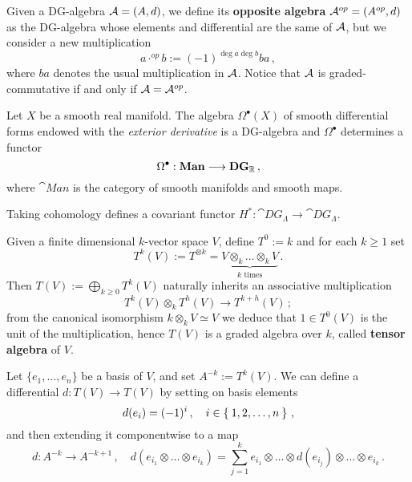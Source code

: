 	\begin{df}
		Given a DG-algebra $\mathcal{A} = (A,d)$, we define its \textbf{opposite algebra}
		$\mathcal{A}^{op} = (A^{op},d)$ as the DG-algebra whose elements and differential
		are the same of $\mathcal{A}$, but we consider a new multiplication
		\begin{equation*}
			a \cdot^{op} b := (-1)^{\deg{a}\deg{b}} ba\,,
		\end{equation*}
		where $ba$ denotes the usual multiplication in $\mathcal{A}$.
		Notice that $\mathcal{A}$ is graded-commutative if and only if $\mathcal{A} = \mathcal{A}^{op}$.
	\end{df}
	
	\begin{ex}
		Let $X$ be a smooth real manifold.
		The algebra $\Omega^{\bullet}(X)$
		of smooth differential forms endowed with 
		the \emph{exterior derivative} is a DG-algebra
		and $\Omega^{\bullet}$ determines a functor
		\begin{equation*}
			\Omega^{\bullet} : {\normalfont\textbf{Man}} \longrightarrow {\normalfont\textbf{DG}}_{{\mathbb R}}\,,
		\end{equation*}
		where $\cat{Man}$ is the category of smooth manifolds and smooth maps.
	\end{ex}
	
	\begin{ex}
		Taking cohomology defines a covariant functor 
		$H^{*}:\cat{DG}_{\Lambda} \to \cat{DG}_{\Lambda}$.
	\end{ex}
	
	\begin{ex}
		Given a finite dimensional $k$-vector space $V$, 
		define $T^{0} := k$ and for each $k \ge 1$ set
		\begin{equation*}
			T^{k}(V) := T^{\otimes k} 
			= \underbrace{V \otimes_{k} \dots \otimes_{k} V}_{k \text{ times}}\,.
		\end{equation*}
		Then $T(V) := \bigoplus_{k \ge 0} T^{k}(V)$ naturally 
		inherits an associative multiplication
		\begin{equation*}
			T^{k}(V) \otimes_{k} T^{h}(V) \longrightarrow T^{k+h}(V)\,;
		\end{equation*}
		from the canonical isomorphism $k \otimes_{k} V \simeq V$ 
		we deduce that $1 \in T^{0}(V)$ is the unit of the multiplication,
		hence $T(V)$ is a graded algebra over $k$,
		called \textbf{tensor algebra} of $V$.
		
		Let $\{e_{1}, \dots, e_{n}\}$ be a basis of $V$,
		and set $A^{-k}:=T^{k}(V)$.
		We can define a differential $d:T(V) \to T(V)$
		by setting on basis elements 
		\begin{equation*}
			d(e_{i}) = (-1)^{i}\,, \quad i \in \Set{1, 2, \dots, n}\,,
		\end{equation*}
		and then extending it componentwise to a map
		\begin{equation*}
			d : A^{-k} \longrightarrow A^{-k+1}\,, \quad
			d(e_{i_{1}} \otimes \dots \otimes e_{i_{k}})
			= \sum_{j=1}^{k} e_{i_1} \otimes \dots 
			\otimes d(e_{i_{j}}) \otimes \dots \otimes e_{i_{k}}\,.
		\end{equation*}
	\end{ex}
	
